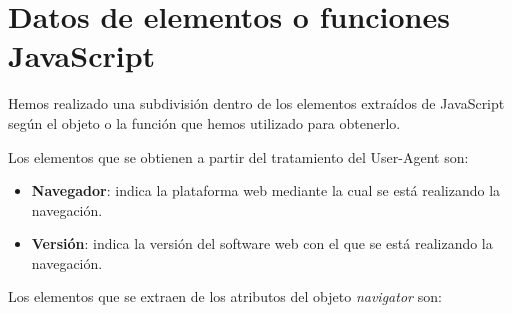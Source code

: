 \section{Datos de elementos o funciones JavaScript}
 Hemos realizado una subdivisión dentro de los elementos extraídos de JavaScript según el objeto o la función que hemos utilizado para obtenerlo.\par
\noindent Los elementos que se obtienen a partir del tratamiento del User-Agent son:
\begin{itemize}
    \item \textbf{Navegador}: indica la plataforma web mediante la cual se está realizando la navegación.
    \item \textbf{Versión}: indica la versión del software web con el que se está realizando la navegación.
\end{itemize}
\noindent Los elementos que se extraen de los atributos del objeto \textit{navigator} son:
